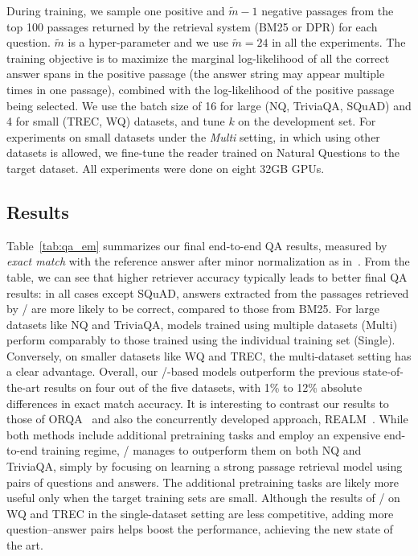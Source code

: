 During training, we sample one positive and $\tilde{m}-1$ negative passages from the top 100 passages returned by the retrieval system (BM25 or DPR) for each question.  $\tilde{m}$ is a hyper-parameter and we use $\tilde{m}=24$ in all the experiments. The training objective is to maximize the marginal log-likelihood of all the correct answer spans in the positive passage (the answer string may appear multiple times in one passage), combined with the log-likelihood of the positive passage being selected. We use the batch size of 16 for large (NQ, TriviaQA, SQuAD) and 4 for small (TREC, WQ) datasets, and tune $k$ on the development set. For experiments on small datasets under the {\em Multi} setting, in which using other datasets is allowed, we fine-tune the reader trained on Natural Questions to the target dataset. All experiments were done on eight 32GB GPUs.




\subsection{Results}

Table~\ref{tab:qa_em} summarizes our final end-to-end QA results, measured by \emph{exact match} with the reference answer after minor normalization as  in~\cite{chen2017reading,lee2019latent}.  From the table, we can see that higher retriever accuracy typically leads to better final QA results: 
in all cases except SQuAD, answers extracted from the passages retrieved by \model/ are more likely to be correct, compared to those from BM25.
For large datasets like NQ and TriviaQA, models trained using multiple datasets (Multi) perform comparably to those trained using the individual training set (Single).  Conversely, on smaller datasets like WQ and TREC, the multi-dataset setting has a clear advantage. Overall, our \model/-based models outperform the previous state-of-the-art results on four out of the five datasets, with 1\% to 12\% absolute differences in exact match accuracy.
It is interesting to contrast our results to those of ORQA~\cite{lee2019latent} and also the concurrently developed approach, REALM~\cite{guu2020realm}. While both methods include additional pretraining tasks and employ an expensive end-to-end training regime, \model/ manages to outperform them on both NQ and TriviaQA, simply by focusing on learning a strong passage retrieval model using pairs of questions and answers.
The additional pretraining tasks are likely more useful only when the target training sets are small. Although the results of \model/ on WQ and TREC in the single-dataset setting are less competitive, adding more question--answer pairs helps boost the performance, achieving the new state of the art.


